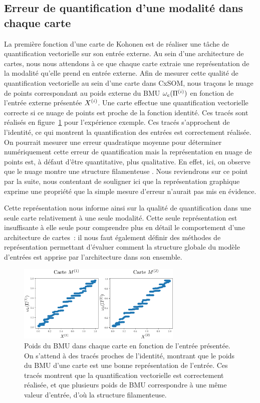 \documentclass[../main]{subfiles}
\begin{document}
\subsection{Erreur de quantification d'une modalité dans chaque carte}

La première fonction d'une carte de Kohonen est de réaliser une tâche de quantification vectorielle sur son entrée externe. Au sein d'une architecture de cartes, nous nous attendons à ce que chaque carte extraie une représentation de la modalité qu'elle prend en entrée externe.
Afin de mesurer cette qualité de quantification vectorielle au sein d'une carte dans CxSOM, nous traçons le nuage de points correspondant au poids externe du BMU $\omega_e(\Pi^{({i})})$ en fonction de l'entrée externe présentée $X^{({i})}$. Une carte effectue une quantification vectorielle correcte si ce nuage de points est proche de la fonction identité.
Ces tracés sont réalisés en figure~\ref{fig:erreur} pour l'expérience exemple. Ces tracés s'approchent de l'identité, ce qui montrent la quantification des entrées est correctement réalisée.
On pourrait mesurer une erreur quadratique moyenne pour déterminer numériquement cette erreur de quantification mais la représentation en nuage de points est, à défaut d'être quantitative, plus qualitative. 
En effet, ici, on observe que le nuage montre une structure \og filamenteuse \fg{}. Nous reviendrons sur ce point par la suite, nous contentant de souligner ici que la représentation graphique exprime une propriété que la simple mesure d'erreur n'aurait pas mis en évidence. 

Cette représentation nous informe ainsi sur la qualité de quantification dans une seule carte relativement à une seule modalité. Cette seule représentation est insuffisante à elle seule pour comprendre plus en détail le comportement d'une architecture de cartes~: il nous faut également définir des méthodes de représentation permettant d'évaluer comment la structure globale du modèle d'entrées est apprise par l'architecture dans son ensemble.

\begin{figure}
    \centering
    \includegraphics[width=0.7\textwidth]{w_x.pdf}
    \caption{Poids du BMU dans chaque carte en fonction de l'entrée présentée. On s'attend à des tracés proches de l'identité, montrant que le poids du BMU d'une carte est une bonne représentation de l'entrée. Ces tracés montrent que la quantification vectorielle est correctement réalisée, et que plusieurs poids de BMU correspondre à une même valeur d'entrée, d'où la structure filamenteuse. \label{fig:erreur}}
\end{figure}
\end{document}
